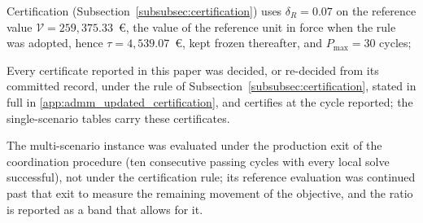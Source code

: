     Certification (Subsection~\ref{subsubsec:certification}) uses $\delta_R = 0.07$ on the reference value $\mathcal{V} = 259{,}375.33$~\euro{}, the value of the reference unit in force when the rule was adopted, hence $\tau = 4{,}539.07$~\euro{}, kept frozen thereafter, and $P_{\max} = 30$ cycles;

    Every certificate reported in this paper was decided, or re-decided from its committed record, under the rule of Subsection~\ref{subsubsec:certification}, stated in full in \ref{app:admm_updated_certification}, and certifies at the cycle reported; the single-scenario tables carry these certificates.

    The multi-scenario instance was evaluated under the production exit of the coordination procedure (ten consecutive passing cycles with every local solve successful), not under the certification rule; its reference evaluation was continued past that exit to measure the remaining movement of the objective, and the ratio is reported as a band that allows for it.
